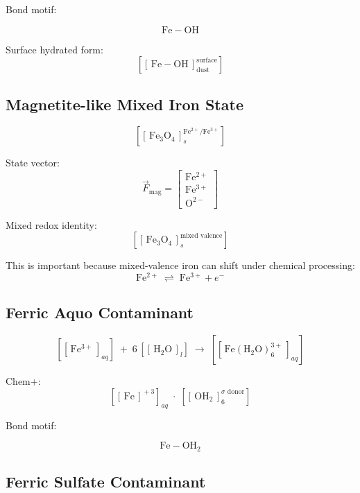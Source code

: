 \documentclass[11pt,a4paper]{article}
\newcommand{\cid}[3]{\!\left[\!\left[\,#1\,\right]^{\!#2}_{\!#3}\!\right]}
\newcommand{\cidb}[2]{\!\left[\!\left[\,#1\,\right]_{\!#2}\!\right]}
\newcommand{\cidp}[2]{\!\left[\!\left[\,#1\,\right]^{\!#2}\!\right]}
\newcommand{\Fmag}{\vec{F}_{\mathrm{mag}}}     %
\begin{document}
Bond motif:
\begin{keybox}
\[\mathrm{Fe{-}OH}\]
\end{keybox}

Surface hydrated form:
\[
\cid{\mathrm{Fe{-}OH}}{\text{surface}}{\text{dust}}
\]

\subsection{Magnetite-like Mixed Iron State}

\[
\cid{\mathrm{Fe_3O_4}}{\mathrm{Fe^{2+}/Fe^{3+}}}{s}
\]

State vector:
\[
\Fmag
=
\begin{bmatrix}
\mathrm{Fe^{2+}}\\[2pt]
\mathrm{Fe^{3+}}\\[2pt]
\mathrm{O^{2-}}
\end{bmatrix}
\]

Mixed redox identity:
\[
\cid{\mathrm{Fe_3O_4}}{\text{mixed valence}}{s}
\]

This is important because mixed-valence iron can shift under chemical
processing:
\[
\mathrm{Fe^{2+}}
\;\rightleftharpoons\;
\mathrm{Fe^{3+}} + e^-
\]

\subsection{Ferric Aquo Contaminant}

\[
\cidb{\mathrm{Fe^{3+}}}{aq}
\;+\; 6\,\cidb{\mathrm{H_2O}}{l}
\;\rightarrow\;
\cidb{\mathrm{Fe(H_2O)_6^{3+}}}{aq}
\]

Chem+:
\[
\cidp{\mathrm{Fe}}{+3}_{\!aq}
\;\cdot\;
\cid{\mathrm{OH_2}}{\sigma\text{ donor}}{6}
\]

Bond motif:
\begin{keybox}
\[\mathrm{Fe{-}OH_2}\]
\end{keybox}

\subsection{Ferric Sulfate Contaminant}
\end{document}
